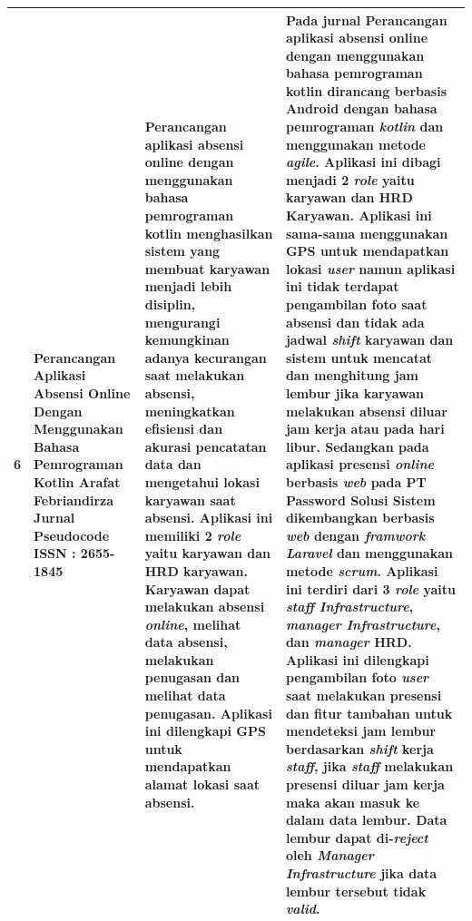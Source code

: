 \begin{longtable}{ |p{0.5cm}|p{3cm}|p{7cm}|p{12cm}|  }
  6 & Perancangan Aplikasi Absensi Online Dengan Menggunakan Bahasa Pemrograman Kotlin
 \newline Arafat Febriandirza
 \newline Jurnal Pseudocode
 \newline ISSN : 2655-1845
 & Perancangan aplikasi absensi online dengan menggunakan bahasa pemrograman kotlin menghasilkan sistem yang membuat karyawan menjadi lebih disiplin, mengurangi kemungkinan adanya kecurangan saat melakukan absensi, meningkatkan efisiensi dan akurasi pencatatan data dan mengetahui lokasi karyawan saat absensi. Aplikasi ini memiliki 2 \textit{role} yaitu karyawan dan HRD karyawan. Karyawan dapat melakukan absensi \textit{online}, melihat data absensi, melakukan penugasan dan melihat data penugasan. Aplikasi ini dilengkapi GPS untuk mendapatkan alamat lokasi saat absensi.
 & Pada jurnal Perancangan aplikasi absensi online dengan menggunakan bahasa pemrograman kotlin dirancang berbasis Android dengan bahasa pemrograman \textit{kotlin} dan menggunakan metode \textit{agile}. Aplikasi ini dibagi menjadi 2 \textit{role} yaitu karyawan dan HRD Karyawan. Aplikasi ini sama-sama menggunakan GPS untuk mendapatkan lokasi \textit{user} namun aplikasi ini tidak terdapat pengambilan foto saat absensi dan tidak ada jadwal \textit{shift} karyawan dan sistem untuk mencatat dan menghitung jam lembur jika karyawan melakukan absensi diluar jam kerja atau pada hari libur.
 \newline 
  \newline
  Sedangkan pada aplikasi presensi \textit{online} berbasis \textit{web} pada PT Password Solusi Sistem dikembangkan berbasis \textit{web} dengan \textit{framwork Laravel} dan menggunakan metode \textit{scrum}. Aplikasi ini terdiri dari 3 \textit{role} yaitu \textit{staff Infrastructure}, \textit{manager Infrastructure}, dan \textit{manager} HRD. Aplikasi ini dilengkapi pengambilan foto \textit{user} saat melakukan presensi dan fitur tambahan untuk mendeteksi jam lembur berdasarkan \textit{shift} kerja \textit{staff}, jika \textit{staff} melakukan presensi diluar jam kerja maka akan masuk ke dalam data lembur. Data lembur dapat di-\textit{reject} oleh \textit{Manager Infrastructure} jika data lembur tersebut tidak \textit{valid}.
 \\ \hline


\end{longtable}

